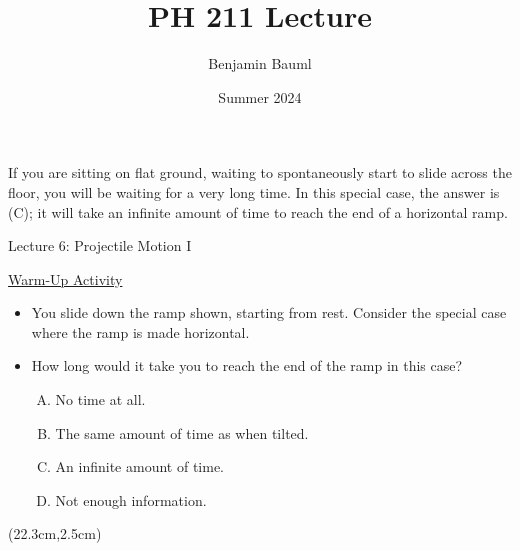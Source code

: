 \documentclass[]{article}
\title{PH 211 Lecture \Week}
\author{Benjamin Bauml}
\date{Summer 2024}
\begin{document}
\begin{TeacherMargin}
\begin{center}
\end{center}
If you are sitting on flat ground, waiting to spontaneously start to slide across the floor, you will be waiting for a very long time. In this special case, the answer is (C); it will take an infinite amount of time to reach the end of a horizontal ramp.
\end{TeacherMargin}
\begin{PresentSpace}
\begin{center}
	\huge Lecture 6: Projectile Motion I
\end{center}
\parbox{10cm}{
\underline{Warm-Up Activity}
\begin{itemize}
	\item You slide down the ramp shown, starting from rest. Consider the special case where the ramp is made horizontal.
	\vspace{-8pt}
	\item How long would it take you to reach the end of the ramp in this case?
	\vspace{-8pt}
	\begin{enumerate}[(A)]
		\item No time at all.
		\item The same amount of time as when tilted.
		\item An infinite amount of time.
		\item Not enough information.
	\end{enumerate}
\end{itemize}
}
\end{PresentSpace}
\begin{textblock*}{5cm}(22.3cm,2.5cm)
\Large
{}
\end{textblock*}
\end{document}
